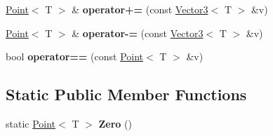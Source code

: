 \begin{DoxyCompactItemize}
\item 
\mbox{\label{class_point_a5b0c2b6bd21f43cbcaccf5b1c6827638}} 
\mbox{\hyperlink{class_point}{Point}}$<$ T $>$ \& {\bfseries operator+=} (const \mbox{\hyperlink{class_vector3}{Vector3}}$<$ T $>$ \&v)
\item 
\mbox{\label{class_point_a75d44882bd74612c0b0f85053fe0d271}} 
\mbox{\hyperlink{class_point}{Point}}$<$ T $>$ \& {\bfseries operator-\/=} (const \mbox{\hyperlink{class_vector3}{Vector3}}$<$ T $>$ \&v)
\item 
\mbox{\label{class_point_a7d02b4083e33bf51eddef1e87a3467a6}} 
bool {\bfseries operator==} (const \mbox{\hyperlink{class_point}{Point}}$<$ T $>$ \&v)
\end{DoxyCompactItemize}
\subsection*{Static Public Member Functions}
\begin{DoxyCompactItemize}
\item 
\mbox{\label{class_point_ac10d989e38dec691c30947ff66c32299}} 
static \mbox{\hyperlink{class_point}{Point}}$<$ T $>$ {\bfseries Zero} ()
\end{DoxyCompactItemize}
